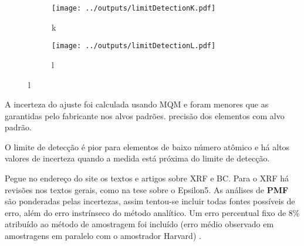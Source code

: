 \begin{figure}[H]
  \caption{}
  \begin{subfigure}[b]{0.5\textwidth}
    \texttt{[image: ../outputs/limitDetectionK.pdf]}
    \caption{k}
  \end{subfigure}%
  \begin{subfigure}[b]{0.5\textwidth}
    \texttt{[image: ../outputs/limitDetectionL.pdf]}
    \caption{l}
  \end{subfigure}
\end{figure}

A incerteza do ajuste foi calculada usando MQM e foram menores que as garantidas
pelo fabricante nos alvos padrões.  precisão dos elementos com alvo padrão. 

O limite de detecção é pior para elementos de baixo número atômico e há
altos valores de incerteza quando a medida está próxima do limite de detecção.

Pegue no endereço do site os textos e artigos sobre XRF e BC.
Para o XRF há revisões nos textos gerais, como na tese sobre o Epsilon5.
As análises de \textbf{PMF} são ponderadas pelas incertezas, assim 
tentou-se incluir todas fontes possíveis de erro, além do erro instrínseco 
do método analítico. Um erro percentual fixo de 8\% atribuído ao método 
de amostragem foi incluído 
(erro médio observado em amostragens em paralelo com o amostrador Harvard)
\citep{santos2014}.





